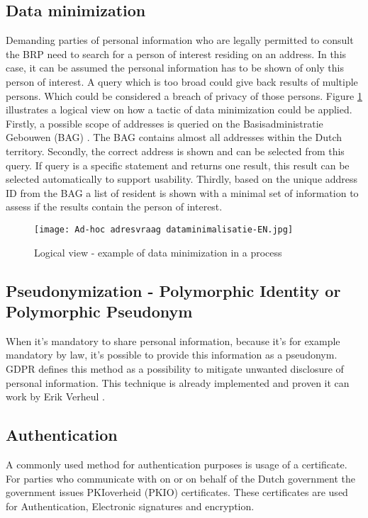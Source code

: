 \subsection{Data minimization}
Demanding parties of personal information who are legally permitted to consult the BRP need to search for a person of interest residing on an address. In this case, it can be assumed the personal information has to be shown of only this person of interest. A query which is too broad could give back results of multiple persons. Which could be considered a breach of privacy of those persons. Figure \ref{fig:Adhoc} illustrates a logical view on how a tactic of data minimization could be applied. Firstly, a possible scope of addresses is queried on the Basisadministratie Gebouwen (BAG) \cite{BAG}. The BAG contains almost all addresses within the Dutch territory. Secondly, the correct address is shown and can be selected from this query. If query is a specific statement and returns one result, this result can be selected automatically to support usability. Thirdly, based on the unique address ID from the BAG a list of resident is shown with a minimal set of information to assess if the results contain the person of interest.    
\graphicspath{ {./images/} }
\begin{figure}
\centering
\label{fig:Adhoc}
\texttt{[image: Ad-hoc adresvraag dataminimalisatie-EN.jpg]}\\
\caption{Logical view - example of data minimization in a process}
\end{figure}

\subsection{Pseudonymization - Polymorphic Identity or Polymorphic Pseudonym}
When it's mandatory to share personal information, because it's for example mandatory by law, it's possible to provide this information as a pseudonym. GDPR \cite{GDPR} defines this method as a possibility to mitigate unwanted disclosure of personal information. 
This technique is already implemented and proven it can work by Erik Verheul \cite{VerheuleID}.

\subsection{Authentication}
A commonly used method for authentication purposes is usage of a certificate. For parties who communicate with on or on behalf of the Dutch government the government issues PKIoverheid (PKIO) certificates. These certificates are used for Authentication, Electronic signatures and encryption. \cite{Logius_PKIO}

